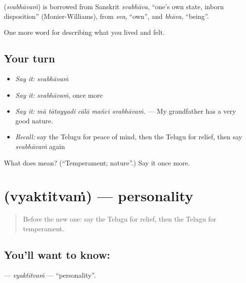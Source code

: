 \begin{cousinweb}
\textbf{} (\emph{svabhāvaṁ}) is borrowed from Sanskrit \emph{svabhāva}, \textquotedblleft{}one's own state, inborn disposition\textquotedblright{} (Monier-Williams), from \emph{sva}, \textquotedblleft{}own\textquotedblright{}, and \emph{bhāva}, \textquotedblleft{}being\textquotedblright{}.
\end{cousinweb}

\begin{grammarlens}[title={What you've built}]
One more word for describing what you lived and felt.
\end{grammarlens}

\subsection*{Your turn}
\begin{itemize}
\raggedright
  \item \emph{Say it:} \emph{svabhāvaṁ}
  \item \emph{Say it:} \emph{svabhāvaṁ}, once more
  \item \emph{Say it:} \emph{mā tātayyadi cālā mañci svabhāvaṁ.} — My grandfather has a very good nature.
  \item \emph{Recall:} say the Telugu for peace of mind, then the Telugu for relief, then say \emph{svabhāvaṁ} again
\end{itemize}

\begin{tcolorbox}[breakable,colback=teal!4,colframe=teal!35!black,title={Before you move on}]
What does  mean? (\textquotedblleft{}Temperament; nature\textquotedblright{}.) Say it once more.
\end{tcolorbox}
\section[\texorpdfstring{\te{వ్యక్తిత్వం} (vyaktitvaṁ)}{వ్యక్తిత్వం (vyaktitvaṁ)}]{ (vyaktitvaṁ) — personality}

\label{lesson:TE-C507-vyaktitvam}



\begin{quote}
Before the new one: say the Telugu for relief, then the Telugu for temperament.
\end{quote}

\subsection*{You'll want to know: }
\textbf{} — \emph{vyaktitvaṁ} — \textquotedblleft{}personality\textquotedblright{}.

